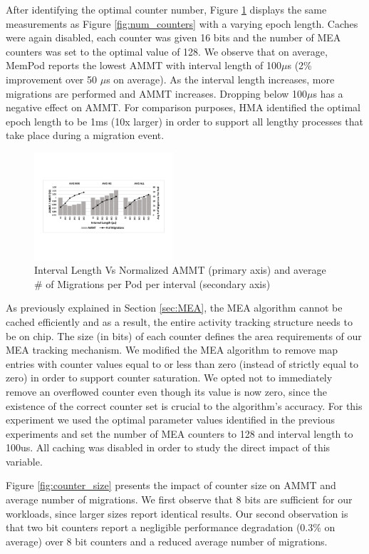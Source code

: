 After identifying the optimal counter number, Figure \ref{fig:interval} displays the same measurements as Figure \ref{fig:num_counters} with a varying epoch length. Caches were again disabled, each counter was given 16 bits and the number of MEA counters was set to the optimal value of 128. We observe that on average, MemPod reports the lowest AMMT with interval length of 100$\mu$s (2\% improvement over 50 $\mu$s on average). As the interval length increases, more migrations are performed and AMMT increases. Dropping below 100$\mu$s has a negative effect on AMMT. For comparison purposes, HMA \cite{meswani-HPCA21} identified the optimal epoch length to be 1ms (10x larger) in order to support all lengthy processes that take place during a migration event.

\begin{figure}[h]
  \includegraphics[width=0.46\textwidth]{figures/interval_length_normalized.pdf}
  \caption{Interval Length Vs Normalized AMMT (primary axis) and average \# of Migrations per Pod per interval (secondary axis)}
  \label{fig:interval}
\end{figure}

As previously explained in Section \ref{sec:MEA}, the MEA algorithm cannot be cached efficiently and as a result, the entire activity tracking structure needs to be on chip. The size (in bits) of each counter defines the area requirements of our MEA tracking mechanism. We modified the MEA algorithm to remove map entries with counter values equal to or less than zero (instead of strictly equal to zero) in order to support counter saturation. We opted not to immediately remove an overflowed counter even though its value is now zero, since the existence of the correct counter set is crucial to the algorithm's accuracy. For this experiment we used the optimal parameter values identified in the previous experiments and set the number of MEA counters to 128 and interval length to 100us. All caching was disabled in order to study the direct impact of this variable.

Figure \ref{fig:counter_size} presents the impact of counter size on AMMT and average number of migrations. We first observe that 8 bits are sufficient for our workloads, since larger sizes report identical results. Our second observation is that two bit counters report a negligible performance degradation (0.3\% on average) over 8 bit counters and a reduced average number of migrations.

